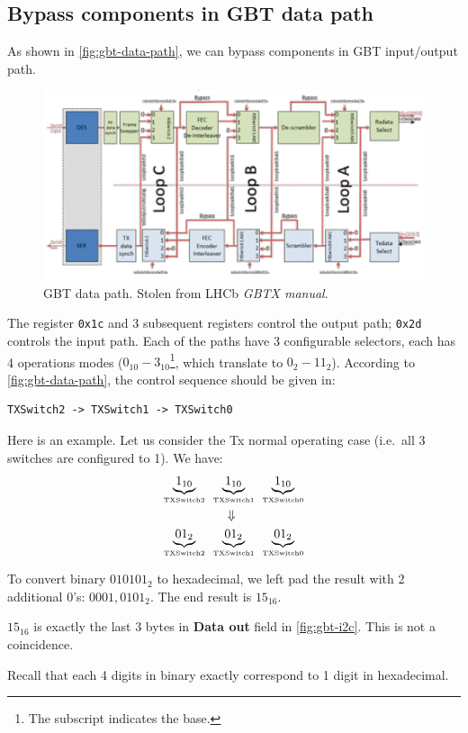 \subsection{Bypass components in GBT data path}
As shown in \autoref{fig:gbt-data-path}, we can bypass components in GBT
input/output path.

\begin{figure}[ht]
    \centering
    \includegraphics[width=\textwidth]{res/gbtx_data_path_block_diagram.pdf}
    \caption{GBT data path. Stolen from LHCb \emph{GBTX manual}.}
    \label{fig:gbt-data-path}
\end{figure}

The register \texttt{0x1c} and 3 subsequent registers control the output path;
\texttt{0x2d} controls the input path.
Each of the paths have 3 configurable selectors, each has 4 operations modes
($0_{10} - 3_{10}$\footnote{The subscript indicates the base.},
which translate to $0_2 - 11_2$). According to \autoref{fig:gbt-data-path}, the
control sequence should be given in:

\begin{lstlisting}
TXSwitch2 -> TXSwitch1 -> TXSwitch0
\end{lstlisting}

Here is an example.
Let us consider the Tx normal operating case (i.e.\ all 3 switches are
configured to 1). We have:
\begin{align*}
    \underbrace{1_{10}}_{\text{\tiny ~TXSwitch2~}}
    &\underbrace{1_{10}}_{\text{\tiny ~TXSwitch1~}}
    \underbrace{1_{10}}_{\text{\tiny ~TXSwitch0~}} \\
    &\symbolwithin{\Downarrow}{\text{\tiny ~TXSwitch0~}} \\
    \underbrace{01_{2}}_{\text{\tiny ~TXSwitch2~}}
    &\underbrace{01_{2}}_{\text{\tiny ~TXSwitch1~}}
    \underbrace{01_{2}}_{\text{\tiny ~TXSwitch0~}} \\
\end{align*}

To convert binary $010101_2$ to hexadecimal, we left pad the result with 2
additional 0's: $0001,0101_2$. The end result is $15_{16}$.

\begin{leftbar}
    $15_{16}$ is exactly the last 3 bytes in \textbf{Data out} field in
    \autoref{fig:gbt-i2c}.
    This is not a coincidence.
\end{leftbar}

\begin{leftbar}
    Recall that each 4 digits in binary exactly correspond to 1 digit in
    hexadecimal.
\end{leftbar}
